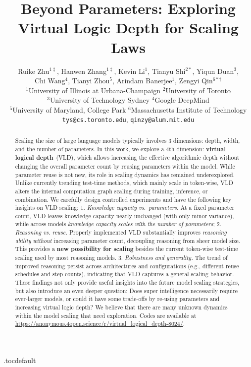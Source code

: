 \documentclass{article} %
\title{Beyond Parameters: Exploring Virtual Logic Depth for Scaling Laws}
\author{
\begin{tabular}{l}
Ruike Zhu$^{1\ddagger}$, 
Hanwen Zhang$^{1\ddagger}$, 
Kevin Li$^{1}$,
Tianyu Shi$^{2*}$,
Yiqun Duan$^{3}$,\\
Chi Wang$^{4}$, 
Tianyi Zhou$^{5}$, 
Arindam Banerjee$^{1}$,
Zengyi Qin$^{6*\dag}$ \\[0.5ex]
$^1$University of Illinois at Urbana-Champaign \quad
$^2$University of Toronto  \\
$^3$University of Technology Sydney \quad
$^4$Google DeepMind \\
$^5$University of Maryland, College Park \quad
$^6$Massachusetts Institute of Technology \\
\small{
\texttt{tys@cs.toronto.edu}, 
\texttt{qinzy@alum.mit.edu}
}
\end{tabular}
}
\begin{document}
\etocdepthtag.toc{default}

\maketitle

\begin{abstract}
Scaling the size of large language models typically involves 3 dimensions: depth, width, and the number of parameters. 
In this work, we explore a 4th dimension: \textbf{virtual logical depth}~(VLD), which allows increasing the effective algorithmic depth without changing the overall parameter count by reusing parameters within the model. While parameter reuse is not new, its role in scaling dynamics has remained underexplored. 
Unlike currently trending test-time methods, which mainly scale in token-wise, VLD alters the internal computation graph scaling during training, inference, or combination. 
We carefully design controlled experiments and have the following key insights on VLD scaling: 
1. \textit{Knowledge capacity vs.~parameters.} At a fixed parameter count, VLD leaves knowledge capacity nearly unchanged (with only minor variance), while across models \emph{knowledge capacity scales with the number of parameters};
2. \textit{Reasoning vs. reuse.} Properly implemented VLD substantially improves \emph{reasoning ability} \emph{without} increasing parameter count, decoupling reasoning from sheer model size. This provides a \textbf{new possibility for scaling} besides the current token-wise test-time scaling used by most reasoning models. 
3. \textit{Robustness and generality.} The trend of improved reasoning persist across architectures and configurations (e.g., different reuse schedules and step counts), indicating that VLD captures a general scaling behavior.
These findings not only provide useful insights into the future model scaling strategies, but also introduce an even deeper question: Does super intelligence necessarily require ever-larger models, or could it have some trade-offs by re-using parameters and increasing virtual logic depth? 
We believe that there are many unknown dynamics within the model scaling that need exploration. 
Codes are available at \url{https://anonymous.4open.science/r/virtual_logical_depth-8024/}. 




\end{abstract}
\end{document}
